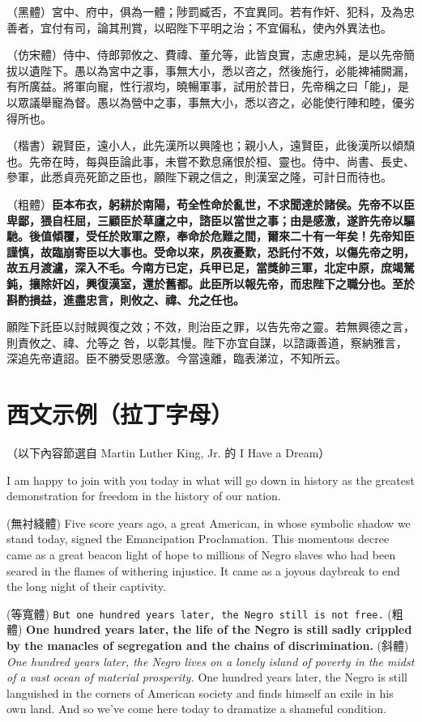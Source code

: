 \documentclass[
oneside,
12pt,
]{book}
\begin{document}
（黑體）{\heiti 宮中、府中，俱為一體；陟罰臧否，不宜異同。若有作奸、犯科，及為忠善者，宜付有司，論其刑賞，以昭陛下平明之治；不宜偏私，使內外異法也。}

（仿宋體）{\fangsong 侍中、侍郎郭攸之、費禕、董允等，此皆良實，志慮忠純，是以先帝簡拔以遺陛下。愚以為宮中之事，事無大小，悉以咨之，然後施行，必能裨補闕漏，有所廣益。將軍向寵，性行淑均，曉暢軍事，試用於昔日，先帝稱之曰「能」，是以眾議舉寵為督。愚以為營中之事，事無大小，悉以咨之，必能使行陣和睦，優劣得所也。}

（楷書）{\kaishu 親賢臣，遠小人，此先漢所以興隆也；親小人，遠賢臣，此後漢所以傾頹也。先帝在時，每與臣論此事，未嘗不歎息痛恨於桓、靈也。侍中、尚書、長史、參軍，此悉貞亮死節之臣也，願陛下親之信之，則漢室之隆，可計日而待也。}

（粗體）\textbf{臣本布衣，躬耕於南陽，苟全性命於亂世，不求聞達於諸侯。先帝不以臣卑鄙，猥自枉屈，三顧臣於草廬之中，諮臣以當世之事；由是感激，遂許先帝以驅馳。後值傾覆，受任於敗軍之際，奉命於危難之間，爾來二十有一年矣！先帝知臣謹慎，故臨崩寄臣以大事也。受命以來，夙夜憂歎，恐託付不效，以傷先帝之明，故五月渡瀘，深入不毛。今南方已定，兵甲已足，當獎帥三軍，北定中原，庶竭駑鈍，攘除奸凶，興復漢室，還於舊都。此臣所以報先帝，而忠陛下之職分也。至於斟酌損益，進盡忠言，則攸之、禕、允之任也。}

願陛下託臣以討賊興復之效；不效，則治臣之罪，以告先帝之靈。若無興德之言，則責攸之、禕、允等之 咎，以彰其慢。陛下亦宜自謀，以諮諏善道，察納雅言，深追先帝遺詔。臣不勝受恩感激。今當遠離，臨表涕泣，不知所云。

\section{西文示例（拉丁字母）}

（以下內容節選自 Martin Luther King, Jr. 的 I Have a Dream）

I am happy to join with you today in what will go down in history as the greatest demonstration for freedom in the history of our nation.

(無衬綫體) \textsf{Five score years ago, a great American, in whose symbolic shadow we stand today, signed the Emancipation Proclamation. This momentous decree came as a great beacon light of hope to millions of Negro slaves who had been seared in the flames of withering injustice. It came as a joyous daybreak to end the long night of their captivity.}

(等寬體) \texttt{But one hundred years later, the Negro still is not free.} (粗體) \textbf{One hundred years later, the life of the Negro is still sadly crippled by the manacles of segregation and the chains of discrimination.} (斜體) \textit{One hundred years later, the Negro lives on a lonely island of poverty in the midst of a vast ocean of material prosperity.} One hundred years later, the Negro is still languished in the corners of American society and finds himself an exile in his own land. And so we've come here today to dramatize a shameful condition.
\end{document}
